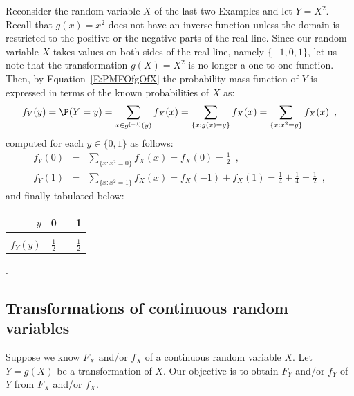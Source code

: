 \begin{example}\label{Eg:DiscreteManyTo1TransYisXSquared}
Reconsider the random variable $X$ of the last two Examples and let $Y=X^2$.  
Recall that $g(x)=x^2$ does not have an inverse function unless the domain is restricted to the positive or the negative parts of the real line.  
Since our random variable $X$ takes values on both sides of the real line, namely $\{-1,0,1\}$, let us note that the transformation $g(X)=X^2$ is no longer a one-to-one function.  
Then, by Equation~\eqref{E:PMFOfgOfX} the probability mass function of $Y$ is expressed in terms of the known probabilities of $X$ as:\\ 
\[
f_Y(y)=\P(Y=y)= \sum_{x \in g^{[-1]}(y)} f_X(x)  = \sum_{\{x:g(x)=y\}} f_X(x) = \sum_{\{x:x^2=y\}} f_X(x) \enspace ,
\]
computed for each $y \in \{0,1\}$ as follows:
\begin{eqnarray*}
f_Y(0) &=& \sum_{\{x:x^2=0\}} f_X(x) = f_X(0)=\frac{1}{2} \enspace ,\\
f_Y(1) &=& \sum_{\{x:x^2=1\}} f_X(x) = f_X(-1)+f_X(1)=\frac{1}{4}+\frac{1}{4}=\frac{1}{2} \enspace ,
\end{eqnarray*}
and finally tabulated below:\\
\begin{center}
\begin{tabular}{r|ccc}
$y$ & 0 & & 1\\ \hline
 &  &  & \\ 
$f_Y(y)$ & $\frac{1}{2}$ & \quad & $\frac{1}{2}$
\end{tabular}\enspace .
\end{center}
\end{example}

\subsection{Transformations of continuous random variables}\label{S:TransformationsOFContinuousRvs}
Suppose we know $F_X$ and/or $f_X$ of a continuous random variable $X$.  
Let $Y=g(X)$ be a transformation of $X$.  
Our objective is to obtain $F_Y$ and/or $f_Y$ of $Y$ from $F_X$ and/or $f_X$.  

